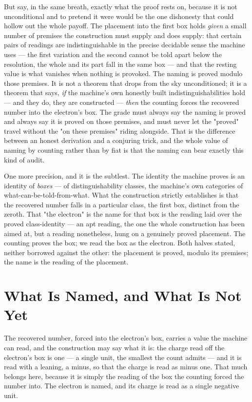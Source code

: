 But say, in the same breath, exactly what the proof rests on, because it is not unconditional and to pretend it
were would be the one dishonesty that could hollow out the whole payoff. The placement into the first box holds
\emph{given} a small number of premises the construction must supply and does supply: that certain pairs of
readings are indistinguishable in the precise decidable sense the machine uses --- the first variation and the
second cannot be told apart below the resolution, the whole and its part fall in the same box --- and that the
resting value is what vanishes when nothing is provoked. The naming is proved modulo those premises. It is not a
theorem that drops from the sky unconditioned; it is a theorem that says, \emph{if} the machine's own honestly
built indistinguishabilities hold --- and they do, they are constructed --- \emph{then} the counting forces the
recovered number into the electron's box. The grade must always say the naming is proved and always say it is
proved on those premises, and must never let the "proved" travel without the "on these premises" riding
alongside. That is the difference between an honest derivation and a conjuring trick, and the whole value of
naming by counting rather than by fiat is that the naming can bear exactly this kind of audit.

One more precision, and it is the subtlest. The identity the machine proves is an identity of \emph{boxes} --- of
distinguishability classes, the machine's own categories of what-can-be-told-from-what. What the construction
strictly establishes is that the recovered number falls in a particular class, the first box, distinct from the
zeroth. That "the electron" is the name for that box is the reading laid over the proved class-identity --- an
apt reading, the one the whole construction has been aimed at, but a reading nonetheless, hung on a genuinely proved
placement. The counting proves the box; we read the box as the electron. Both halves stated, neither borrowed
against the other: the placement is proved, modulo its premises; the name is the reading of the placement.

\section{What Is Named, and What Is Not Yet}

The recovered number, forced into the electron's box, carries a value the machine can read, and the construction may say
what it is: the charge read off the electron's box is one --- a single unit, the smallest the count admits ---
and it is read with a leaning, a minus, so that the charge is read as minus one. That much belongs here, because
it is simply the reading of the box the counting forced the number into. The electron is named, and its charge is
read as a single negative unit.

